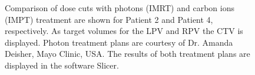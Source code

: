 \begin{figure}[H]
\caption{Comparison of dose cuts with photons (IMRT) and carbon ions (IMPT) treatment are shown for Patient 2 and Patient 4, respectively. 
As target volumes for the LPV and RPV the CTV is displayed. Photon treatment plans are courtesy of Dr. Amanda Deisher, Mayo Clinic, USA. 
The results of both treatment plans are displayed in the software Slicer.} 
\label{dose_IMRT_vs_IMPT}
\end{figure}

\vspace*{-0.3cm}

